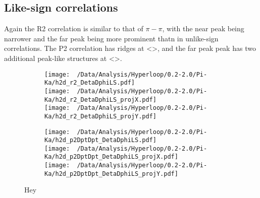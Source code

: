 \documentclass[12pt,a4paper,twoside]{report}
\begin{document}
\subsection{Like-sign correlations}
Again the R2 correlation is similar to that of $\pi-\pi$, with the near peak being narrower and the far peak being more prominent thatn in unlike-sign correlations. The P2 correlation has ridges at <>, and the far peak peak has two additional peak-like structures at <>.
\begin{figure}[H]
	\begin{subfigure}{0.49\linewidth}
		\texttt{[image: ~/Data/Analysis/Hyperloop/0.2-2.0/Pi-Ka/h2d\_r2\_DetaDphiLS.pdf]}\\
		\texttt{[image: ~/Data/Analysis/Hyperloop/0.2-2.0/Pi-Ka/h2d\_r2\_DetaDphiLS\_projX.pdf]}\\
		\texttt{[image: ~/Data/Analysis/Hyperloop/0.2-2.0/Pi-Ka/h2d\_r2\_DetaDphiLS\_projY.pdf]}\\
	\end{subfigure}
	\begin{subfigure}{0.49\linewidth}
		\texttt{[image: ~/Data/Analysis/Hyperloop/0.2-2.0/Pi-Ka/h2d\_p2DptDpt\_DetaDphiLS.pdf]}\\
		\texttt{[image: ~/Data/Analysis/Hyperloop/0.2-2.0/Pi-Ka/h2d\_p2DptDpt\_DetaDphiLS\_projX.pdf]}\\
		\texttt{[image: ~/Data/Analysis/Hyperloop/0.2-2.0/Pi-Ka/h2d\_p2DptDpt\_DetaDphiLS\_projY.pdf]}\\
	\end{subfigure}
	\caption{Hey}
\end{figure}
\end{document}
